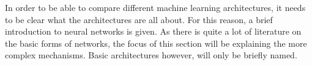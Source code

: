 In order to be able to compare different machine learning architectures, it needs to be clear what the architectures are all about. 
For this reason, a brief introduction to neural networks is given. 
As there is quite a lot of literature on the basic forms of networks, the focus of this section will be explaining the more complex mechanisms.
Basic architectures however, will only be briefly named. 
